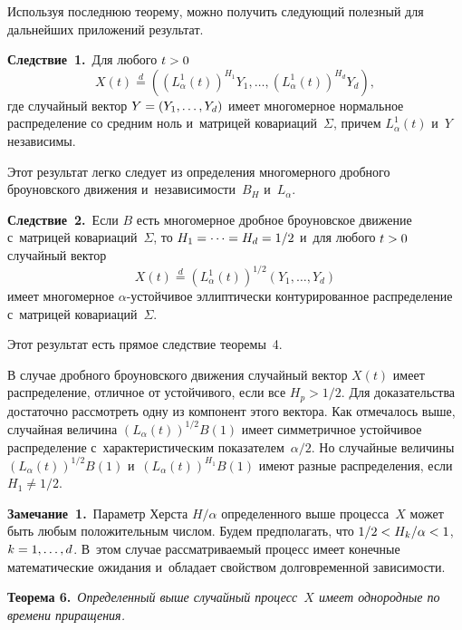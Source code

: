 \begin{multicols}{2}
Используя последнюю теорему, можно получить следующий полезный 
для дальнейших приложений результат.

\smallskip

\noindent
\textbf{Следствие~1.}\
Для любого $t\hm>0$
$$
X(t) \stackrel{d}{=} ((L_{\alpha}^1 (t))^{H_1}  Y_1 , \ldots , (L_{\alpha}^1 (t))^{H_d}  Y_d ) ,
$$
где случайный вектор $Y \hm= (Y_1 , \ldots , Y_d )$ имеет многомерное 
нормальное распределение со средним ноль и~матрицей ковариаций~$\Sigma$,
причем $L_{\alpha}^1 (t)$ и~$Y$ независимы.


\smallskip


Этот результат легко следует из определения многомерного дробного 
броуновского движения и~независимости~$B_H$ и~$L_{\alpha}$.

\smallskip

\noindent
\textbf{Следствие~2.}\
 Если $B$ есть многомерное дробное броуновское движение с~матрицей ковариаций~$\Sigma$, 
 то
$H_1 \hm= \cdots \hm= H_d \hm= 1/2$ и~для любого $t\hm>0$ случайный вектор
$$
X(t) \stackrel{d}{=} (L_{\alpha}^1 (t))^{1/2} (Y_1 , \ldots , Y_d )
$$
имеет многомерное $\alpha$-устой\-чи\-вое эллиптически контурированное распределение 
с~матрицей ковариаций~$\Sigma$.


\smallskip

Этот результат есть прямое следствие теоремы~4.

В случае дробного броуновского движения случайный вектор $X(t)$ имеет распределение, отличное от устойчивого, если все $H_p >1/2$. Для доказательства
достаточно рассмотреть одну из компонент этого вектора. Как отмечалось выше, случайная величина $(L_{\alpha} (t) )^{1/2} B(1)$ имеет симметричное
устойчивое распределение с~характеристическим показателем~$\alpha/2$. Но случайные величины $(L_{\alpha} (t) )^{1/2} B(1)$ и~$(L_{\alpha} (t) )^{H_1 } B(1)$
имеют разные распределения, если $H_1 \not= 1/2$.


\smallskip

\noindent
\textbf{Замечание~1.}\ 
Параметр Херста $H/\alpha$ определенного выше процесса~$X$ может быть любым положительным числом. Будем предполагать,
что $1/2 \hm< H_k /\alpha \hm<1$, $k\hm= 1,\ldots ,d$. 
В~этом случае рассматриваемый процесс имеет конечные математические ожидания 
и~обладает свойством долговременной зависимости.


\smallskip




\noindent
\textbf{Теорема 6.}\
\textit{Определенный выше случайный процесс~$X$ имеет однородные по времени приращения.}



\end{multicols}
